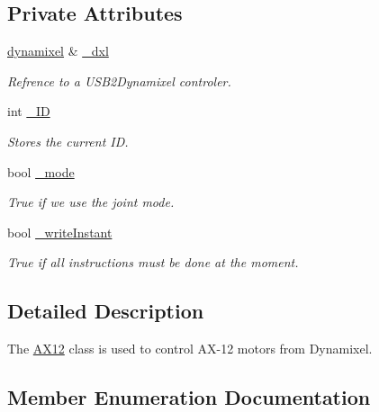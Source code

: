 \subsection*{Private Attributes}
\begin{DoxyCompactItemize}
\item 
\hyperlink{classdynamixel}{dynamixel} \& \hyperlink{class_a_x12_a1e303392ec22c6e905865a8e267b78fe}{\+\_\+dxl}
\begin{DoxyCompactList}\small\item\em Refrence to a U\+S\+B2\+Dynamixel controler. \end{DoxyCompactList}\item 
int \hyperlink{class_a_x12_a0ae2b35fee3d120075e1d8f1e2055804}{\+\_\+\+I\+D}
\begin{DoxyCompactList}\small\item\em Stores the current I\+D. \end{DoxyCompactList}\item 
bool \hyperlink{class_a_x12_a2fd07e2e636003227a32d09d211bd6d4}{\+\_\+mode}
\begin{DoxyCompactList}\small\item\em True if we use the joint mode. \end{DoxyCompactList}\item 
bool \hyperlink{class_a_x12_aeb6e6414fe4a02d77a1d84d5213800e2}{\+\_\+write\+Instant}
\begin{DoxyCompactList}\small\item\em True if all instructions must be done at the moment. \end{DoxyCompactList}\end{DoxyCompactItemize}


\subsection{Detailed Description}
The \hyperlink{class_a_x12}{A\+X12} class is used to control A\+X-\/12 motors from Dynamixel. 

\subsection{Member Enumeration Documentation}
\hypertarget{class_a_x12_a672068c48bbee921e5856cc44b1c81c1}{}
